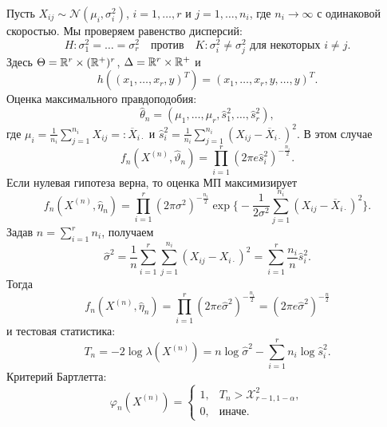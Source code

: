 \begin{exmp}
	Пусть $X_{ij} \sim \mathcal{N}(\mu_i, \sigma_i^2)$, $i = 1, \dots, r$ и $j = 1, \dots, n_i$, где $n_i \rightarrow \infty$ с одинаковой скоростью. Мы проверяем равенство дисперсий:
	\[ H: \sigma_1^2 = \dots = \sigma_r^2 \quad \text{против} \quad K: \sigma_i^2 \neq \sigma_j^2 \text{ для некоторых } i \neq j. \]
	Здесь $\Theta = \mathbb{R}^r \times (\mathbb{R}^+)^r$, $\Delta = \mathbb{R}^r \times \mathbb{R}^+$ и 
	\[h((x_1, \dots, x_r, y)^T) = (x_1, \dots, x_r, y, \dots, y)^T.\]
	Оценка максимального правдоподобия:
	\[ \hat{\theta}_n = (\mu_1, \dots, \mu_r, \hat{s}_1^2, \dots, \hat{s}_r^2),  \]
	где $\mu_i = \frac{1}{n_i} \sum_{j=1}^{n_i}X_{ij} =: \overline{X}_{i \cdot} $ и $\hat{s}_i^2 = \frac{1}{n_i}\sum_{j=1}^{n_i}(X_{ij} -\overline{X}_{i \cdot})^2. $ 
	В этом случае
	\[ f_n(X^{(n)}, \hat{\vartheta}_n) = \prod_{i=1}^{r} (2 \pi e \hat{s}_i^2)^{-\frac{n_i}{2}}. \]
	Если нулевая гипотеза верна, то оценка МП максимизирует
	\[ f_n(X^{(n)}, \hat{\eta}_n) = \prod_{i=1}^{r} (2 \pi \sigma^2)^{-\frac{n_i}{2}} \exp \Big\{ -\frac{1}{2\sigma^2} \sum_{j=1}^{n_i} (X_{ij} - \overline{X}_{i \cdot})^2 \Big \}. \]
	Задав $n = \sum_{i=1}^{r}n_i$, получаем
	\[ \hat{\sigma}^2 = \frac{1}{n}\sum_{i=1}^{r} \sum_{j=1}^{n_i} (X_{ij}-X_{i \cdot})^2 = \sum_{i=1}^r \frac{n_i}{n}\hat{s}_i^2. \]
	Тогда
	\[f_n(X^{(n)}, \hat{\eta}_n) = \prod_{i=1}^{r}(2\pi e\hat{\sigma}^2)^{-\frac{n_i}{2}} = (2\pi e \hat{\sigma}^2)^{-\frac{n}{2}} \]
	и тестовая статистика:
	\[T_n = -2\log \lambda(X^{(n)}) = n \log \hat{\sigma}^2 - \sum_{i=1}^{r} n_i \log \hat{s}_i^2.  \]
	Критерий Бартлетта:
	\[ \varphi_n(X^{(n)}) =
	\left \{
	\begin{array}{cl}
	1, & T_n > \mathcal{X}_{r-1, 1-\alpha}^2, \\
	0, & \text{иначе}. 
	\end{array}
	\right.
	\]
\end{exmp}

